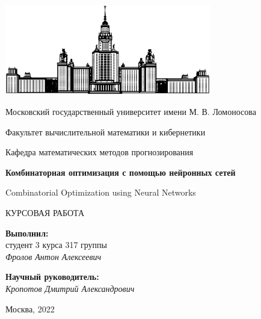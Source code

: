 \documentclass[12pt]{article}
\begin{document}
\begin{titlepage}
\begin{center}

    \includegraphics[width=9cm]{msu.eps}

    \bigskip

    Московский государственный университет имени М. В. Ломоносова

    Факультет вычислительной математики и кибернетики

    Кафедра математических методов прогнозирования

    \vspace{1.5cm}


    \vspace{1.5cm}

    \textbf{\LARGE Комбинаторная оптимизация с помощью нейронных сетей}

    \vspace{0.5cm}

    {\Large{Combinatorial Optimization using Neural Networks}}

    \vspace{1.5cm}

    {\large КУРСОВАЯ РАБОТА}

    \vspace{3cm}

    \begin{flushright}
        \parbox{0.4\textwidth}{
            \textbf{Выполнил:}\\
            студент 3 курса 317 группы\\
            \textit{Фролов Антон Алексеевич}
        }
    \end{flushright}
    
    
    \begin{flushright}
        \parbox{0.4\textwidth}{
            \textbf{Научный руководитель:}\\
            \textit{Кропотов Дмитрий Александрович}
        }
    \end{flushright}

    \vspace{\fill}
    Москва, 2022
\end{center}
\end{titlepage}
\end{document}
